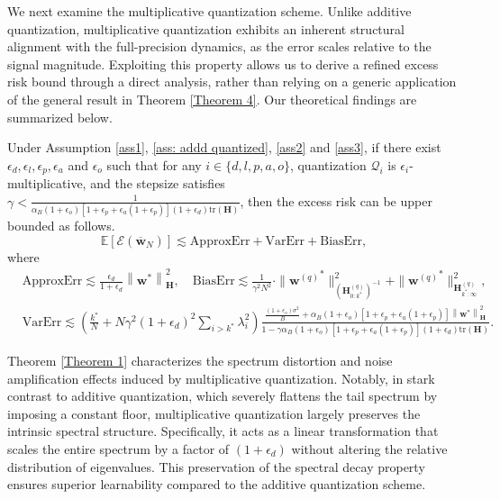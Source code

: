 \documentclass[11pt, letterpaper]{article}
\begin{document}
We next examine the multiplicative quantization scheme. Unlike additive quantization, multiplicative quantization exhibits an inherent structural alignment with the full-precision dynamics, as the error scales relative to the signal magnitude. Exploiting this property allows us to derive a refined excess risk bound through a direct analysis, rather than relying on a generic application of the general result in Theorem \ref{Theorem 4}. Our theoretical findings are summarized below.
\begin{theorem}
    \label{Theorem 1}
    Under Assumption \ref{ass1}, \ref{ass: addd quantized}, \ref{ass2} and \ref{ass3}, if there exist $\epsilon_d,\epsilon_l,\epsilon_p,\epsilon_a$ and $\epsilon_o$ such that for any $i\in \{d,l,p,a,o\}$, quantization $\mathcal{Q}_i$ is $\epsilon_i$-multiplicative, and the stepsize satisfies $\gamma < \frac{1}{ \alpha_B (1+\epsilon_o)[1+\epsilon_p+\epsilon_a(1+\epsilon_p)](1+\epsilon_d)\mathrm{tr}(\mathbf{H})}$, then the excess risk can be upper bounded as follows.
    \begin{equation*}
        \mathbb{E}[\mathcal{E}(\overline{\mathbf{w}}_N)] \lesssim \mathrm{ApproxErr}+\mathrm{VarErr}+\mathrm{BiasErr},
    \end{equation*}
    where
    \begin{equation*}
        \begin{aligned}
            &\mathrm{ApproxErr}\lesssim \frac{\epsilon_d}{1+\epsilon_d}\left\|\mathbf{w}^*\right\|_\mathbf{H}^2,\quad \mathrm{BiasErr}\lesssim\frac{1}{\gamma^2N^2}\cdot\|{\mathbf{w}^{(q)}}^*\|_{(\mathbf{H}_{0:k^*}^{(q)})^{-1}}^2+\|{\mathbf{w}^{(q)}}^*\|_{\mathbf{H}_{k^*:\infty}^{(q)}}^2,\\
            &\mathrm{VarErr}\lesssim\left(\frac{k^*}{N}+N\gamma^2(1+\epsilon_d)^2\sum_{i>k^*}\lambda_i^2\right) \frac{\frac{(1+\epsilon_o)\sigma^2}{B}+\alpha_B(1+\epsilon_o) [1+\epsilon_p+\epsilon_a(1+\epsilon_p)]\left\|\mathbf{w}^*\right\|_\mathbf{H}^2}{1-\gamma\alpha_B(1+\epsilon_o)[1+\epsilon_p+\epsilon_a(1+\epsilon_p)](1+\epsilon_d)\mathrm{tr}\left(\mathbf{H}\right)}.
        \end{aligned}
    \end{equation*}
\end{theorem}

Theorem \ref{Theorem 1} characterizes the spectrum distortion and noise amplification effects induced by multiplicative quantization. Notably, in stark contrast to additive quantization, which severely flattens the tail spectrum by imposing a constant floor, multiplicative quantization largely preserves the intrinsic spectral structure. Specifically, it acts as a linear transformation that scales the entire spectrum by a factor of $(1+\epsilon_d)$ without altering the relative distribution of eigenvalues. This preservation of the spectral decay property ensures superior learnability compared to the additive quantization scheme.
\end{document}
